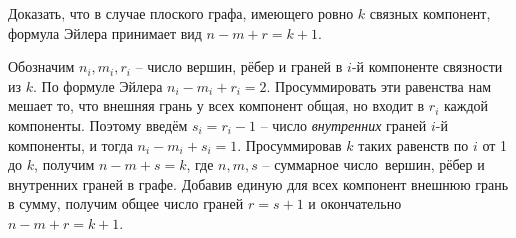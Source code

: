 \documentclass[a4paper,12pt]{article}
\numberwithin{figure}{section}
\begin{document}
\begin{problem}
	Доказать, что в случае плоского графа, имеющего ровно $k$ связных компонент, формула Эйлера принимает вид $n-m+r=k+1$.
\end{problem}
\begin{solution}
	Обозначим $n_i,m_i,r_i$ -- число вершин, рёбер и граней в $i$-й компоненте связности из $k$. По формуле Эйлера $n_i-m_i+r_i=2$. Просуммировать эти равенства нам мешает то, что внешняя грань у всех компонент общая, но входит в $r_i$ каждой компоненты. Поэтому введём $s_i=r_i-1$ -- число \textit{внутренних} граней $i$-й компоненты, и тогда $n_i-m_i+s_i=1$. Просуммировав $k$ таких равенств по $i$ от 1 до $k$, получим $n-m+s=k$, где $n,m,s$ -- суммарное число вершин, рёбер и внутренних граней в графе. Добавив единую для всех компонент внешнюю грань в сумму, получим общее число граней $r=s+1$ и окончательно $n-m+r=k+1$.
\end{solution}
\end{document}
